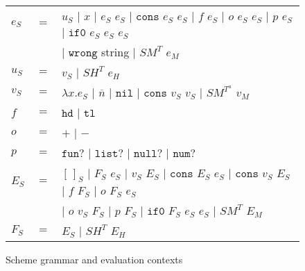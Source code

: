 \begin{figure}[p]
\centering
\begin{tabular}{lcl}
\vspace{5pt}

$e_{S}$ & $=$ & $u_{S}$ $\vert$ $x$ $\vert$ $e_{S}$ $e_{S}$ $\vert$ $\mathtt{cons}$ $e_{S}$ $e_{S}$ $\vert$ $f$ $e_{S}$ $\vert$ $o$ $e_{S}$ $e_{S}$ $\vert$ $p$ $e_{S}$ $\vert$ $\mathtt{if0}$ $e_{S}$ $e_{S}$ $e_{S}$ \\

\vspace{5pt}

&& $\vert$ $\mathtt{wrong}$ string $\vert$ $SM^{T}$ $e_{M}$ \\

\vspace{5pt}

$u_{S}$ & $=$ & $v_{S}$ $\vert$ $SH^{T}$ $e_{H}$ \\

\vspace{5pt}

$v_{S}$ & $=$ & $\lambda x.e_{S}$ $\vert$ $\overline{n}$ $\vert$ $\mathtt{nil}$ $\vert$ $\mathtt{cons}$ $v_{S}$ $v_{S}$ $\vert$ $SM^{T^{a}}$ $v_{M}$ \\

\vspace{5pt}

$f$ & $=$ & $\mathtt{hd}$ $\vert$ $\mathtt{tl}$ \\

\vspace{5pt}

$o$ & $=$ & $+$ $\vert$ $-$ \\

\vspace{5pt}

$p$ & $=$ & $\mathtt{fun?}$ $\vert$ $\mathtt{list?}$ $\vert$ $\mathtt{null?}$ $\vert$ $\mathtt{num?}$ \\

\vspace{5pt}

$E_{S}$ & $=$ & $[\,]_{S}$ $\vert$ $F_{S}$ $e_{S}$ $\vert$ $v_{S}$ $E_{S}$ $\vert$ $\mathtt{cons}$ $E_{S}$ $e_{S}$ $\vert$ $\mathtt{cons}$ $v_{S}$ $E_{S}$ $\vert$ $f$ $F_{S}$ $\vert$ $o$ $F_{S}$ $e_{S}$ \\

\vspace{5pt}

&& $\vert$ $o$ $v_{S}$ $F_{S}$ $\vert$ $p$ $F_{S}$ $\vert$ $\mathtt{if0}$ $F_{S}$ $e_{S}$ $e_{S}$ $\vert$ $SM^{T}$ $E_{M}$ \\

\vspace{5pt}

$F_{S}$ & $=$ & $E_{S}$ $\vert$ $SH^{T}$ $E_{H}$
\end{tabular}
\caption{Scheme grammar and evaluation contexts}
\label{sg}
\end{figure}
